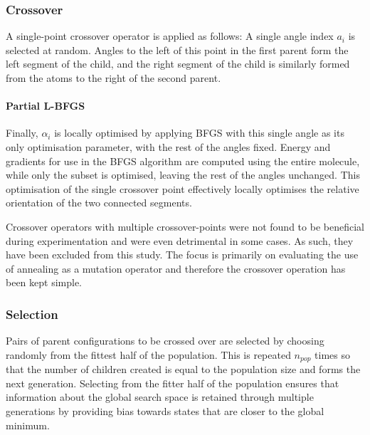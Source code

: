 \documentclass{article}
\begin{document}

\subsubsection{Crossover}

A single-point crossover operator is applied as follows: A single angle index
$a_i$ is selected at random. Angles to the left of this point in the first
parent form the left segment of the child, and the right segment of the child is
similarly formed from the atoms to the right of the second parent.

\paragraph{Partial L-BFGS}

Finally, $\alpha_i$ is locally optimised by applying BFGS with this single angle
as its only optimisation parameter, with the rest of the angles fixed. Energy
and gradients for use in the BFGS algorithm are computed using the entire
molecule, while only the subset is optimised, leaving the rest of the angles
unchanged. This optimisation of the single crossover point effectively locally
optimises the relative orientation of the two connected segments.

Crossover operators with multiple crossover-points were not found to be
beneficial during experimentation and were even detrimental in some cases. As
such, they have been excluded from this study. The focus is primarily on
evaluating the use of annealing as a mutation operator and therefore the
crossover operation has been kept simple.

\subsubsection{Selection}

Pairs of parent configurations to be crossed over are selected by choosing
randomly from the fittest half of the population. This is repeated $n_{pop}$
times so that the number of children created is equal to the population size and
forms the next generation. Selecting from the fitter half of the population
ensures that information about the global search space is retained through
multiple generations by providing bias towards states that are closer to the
global minimum.
\end{document}
